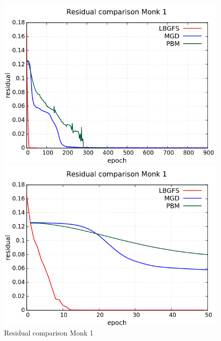\begin{figure}[H]
	\centering
	\begin{minipage}[t]{0.5\linewidth}
		\includegraphics[width=\linewidth]{data/Comparison/Monk1/Monk1_R_Comparison_standard.png}
	\end{minipage}%
	\begin{minipage}[t]{0.5\linewidth}
		\includegraphics[width=\linewidth]{data/Comparison/Monk1/Monk1_R_Comparison_zoom.png}
	\end{minipage}
	\caption{Residual comparison Monk 1}
	\label{R-Monk1}
\end{figure}
